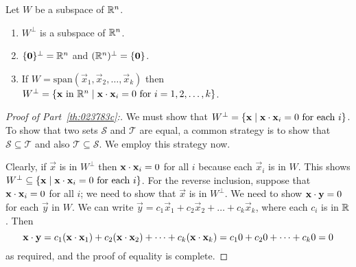 \documentclass{ximera}
\begin{document}
\begin{theorem}\label{th:023783}
Let $W$ be a subspace of $\mathbb{R}^n$.
\begin{enumerate}
\item\label{th:023783a} $W^\perp$ is a subspace of $\mathbb{R}^n$.

\item\label{th:023783b} $\{\mathbf{0}\}^\perp = \mathbb{R}^n$ and $(\mathbb{R}^n)^\perp = \{\mathbf{0}\}$.

\item\label{th:023783c} If $W = \mbox{span}\left(\vec{x}_{1}, \vec{x}_{2}, \dots, \vec{x}_{k}\right)$ then $W^\perp = \{\mathbf{x} \mbox{ in } \mathbb{R}^n \mid \mathbf{x} \cdot \mathbf{x}_{i} = 0 \mbox{ for } i = 1, 2, \dots, k\}$.

\end{enumerate}
\end{theorem}

\begin{proof}[Proof of Part~\ref{th:023783c}:]
We must show that $W^\perp = \{\mathbf{x} \mid \mathbf{x} \cdot \mathbf{x}_{i} = 0 \mbox{ for each } i\}$.  To show that two sets $\mathcal{S}$ and $\mathcal{T}$ are equal, a common strategy is to show that $\mathcal{S} \subseteq \mathcal{T}$ and also $\mathcal{T} \subseteq \mathcal{S}$.  We employ this strategy now.

Clearly, if $\vec{x}$ is in $W^\perp$ then $\mathbf{x} \cdot \mathbf{x}_{i} = 0$ for all $i$ because each $\vec{x}_{i}$ is in $W$. This shows $W^\perp \subseteq \{\mathbf{x} \mid \mathbf{x} \cdot \mathbf{x}_{i} = 0 \mbox{ for each } i\}$. For the reverse inclusion, suppose that $\mathbf{x} \cdot \mathbf{x}_{i} = 0$ for all $i$; we need to show that $\vec{x}$ is in $W^\perp$.  We need to show $\mathbf{x} \cdot \mathbf{y} = 0$ for each $\vec{y}$ in $W$. We can write $\vec{y} = c_{1}\vec{x}_{1} + c_{2}\vec{x}_{2} + \dots  + c_{k}\vec{x}_{k}$, where each $c_{i}$ is in $\mathbb{R}$. Then
\begin{equation*}
\mathbf{x} \cdot \mathbf{y} = c_{1}(\mathbf{x} \cdot \mathbf{x}_{1}) + c_{2}(\mathbf{x} \cdot \mathbf{x}_{2})+ \dots +c_{k}(\mathbf{x} \cdot \mathbf{x}_{k}) = c_{1}0 + c_{2}0 + \dots + c_{k}0 = 0
\end{equation*}
 as required, and the proof of equality is complete.

\end{proof}
\end{document}
